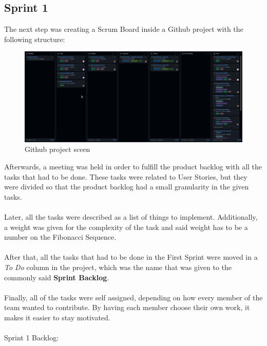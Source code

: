 \documentclass[./main.tex]{subfiles}
\begin{document}
\hypertarget{sprint-1}{%
\subsection{Sprint 1}\label{sprint-1}}

The next step was creating a Scrum Board inside a Github project with
the following structure:

\begin{figure}[h]
\centering
\includegraphics[width=\linewidth]{img/scrum_board.png}
\caption{Github project sceen}
\end{figure}

Afterwards, a meeting was held in order to fulfill the product backlog
with all the tasks that had to be done. These tasks were related to User
Stories, but they were divided so that the product backlog had a small
granularity in the given tasks.
\\
\\

Later, all the tasks were described as a list of things to implement.
Additionally, a weight was given for the complexity of the task and
said weight has to be a number on the Fibonacci Sequence.
\\
\\

After that, all the tasks that had to be done in the First Sprint were
moved in a \emph{To Do} column in the project, which was the name that
was given to the commonly said \textbf{Sprint Backlog}.
\\
\\

Finally, all of the tasks were self assigned, depending on how every
member of the team wanted to contribute. By having each member choose
their own work, it makes it easier to stay motivated.
\\
\\

Sprint 1 Backlog:
\end{document}
